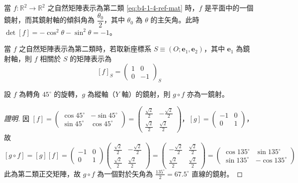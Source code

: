 \begin{proposition}[命題 8]
當 $f: \mathbb{R}^2 \to \mathbb{R}^2$ 之自然矩陣表示為第二類 \eqref{eq:b4-1-4-ref-mat} 時，$f$ 是平面中的一個鏡射，而其鏡射軸的傾斜角為 $\dfrac{\theta_0}{2}$，其中 $\theta_0$ 為 $\theta$ 的主矢角。此時 $\det[f] = -\cos^2\theta - \sin^2\theta = -1$。
\end{proposition}

\begin{proposition}[命題 9]
當 $f$ 之自然矩陣表示為第二類時，若取新座標系 $S \equiv (O; \mathbf{e}_1, \mathbf{e}_2)$，其中 $\mathbf{e}_1$ 為鏡射軸，則 $f$ 相關於 $S$ 的矩陣表示為
\[ [f]_S = \begin{pmatrix} 1 & 0 \\ 0 & -1 \end{pmatrix}_S \]
\end{proposition}

\begin{example}[論例 3]
設 $f$ 為轉角 $45^\circ$ 的旋轉，$g$ 為縱軸（$Y$ 軸）的鏡射，則 $g \circ f$ 亦為一鏡射。
\end{example}

\begin{proof}[證明]
因 $[f] = \begin{pmatrix} \cos 45^\circ & -\sin 45^\circ \\ \sin 45^\circ & \cos 45^\circ \end{pmatrix} = \begin{pmatrix} \frac{\sqrt{2}}{2} & -\frac{\sqrt{2}}{2} \\ \frac{\sqrt{2}}{2} & \frac{\sqrt{2}}{2} \end{pmatrix}$，$[g] = \begin{pmatrix} -1 & 0 \\ 0 & 1 \end{pmatrix}$，故
\[ [g \circ f] = [g][f] = \begin{pmatrix} -1 & 0 \\ 0 & 1 \end{pmatrix} \begin{pmatrix} \frac{\sqrt{2}}{2} & -\frac{\sqrt{2}}{2} \\ \frac{\sqrt{2}}{2} & \frac{\sqrt{2}}{2} \end{pmatrix} = \begin{pmatrix} -\frac{\sqrt{2}}{2} & \frac{\sqrt{2}}{2} \\ \frac{\sqrt{2}}{2} & \frac{\sqrt{2}}{2} \end{pmatrix} = \begin{pmatrix} \cos 135^\circ & \sin 135^\circ \\ \sin 135^\circ & -\cos 135^\circ \end{pmatrix} \]
此為第二類正交矩陣，故 $g \circ f$ 為一個對於矢角為 $\frac{135^\circ}{2} = 67.5^\circ$ 直線的鏡射。
\end{proof}

